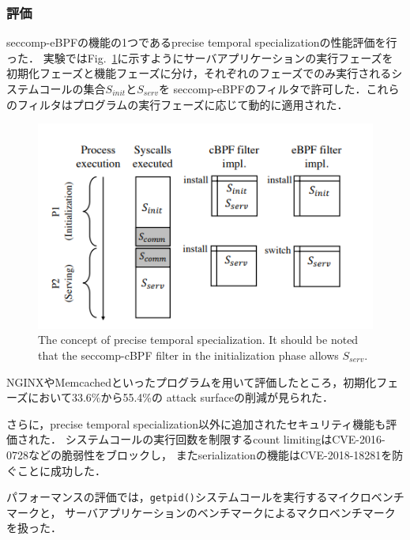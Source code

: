 \documentclass[platex,a4j,10pt,twoside,twocolumn,dvipdfmx]{jsarticle}
\newcommand{\Fref}[1]{Fig.~\ref{#1}}
\begin{document}
    \subsubsection{評価}
      seccomp-eBPFの機能の1つであるprecise temporal specializationの性能評価を行った．
      実験では\Fref{img:tmp-spec}に示すようにサーバアプリケーションの実行フェーズを
      初期化フェーズと機能フェーズに分け，それぞれのフェーズでのみ実行されるシステムコールの集合$S_{init}とS_{serv}$を
      seccomp-eBPFのフィルタで許可した．これらのフィルタはプログラムの実行フェーズに応じて動的に適用された．
      \begin{figure}[tp]
        \begin{center}
          \includegraphics[width=\columnwidth]{./img/tmp-spec.png}
        \end{center}
        \caption{The concept of precise temporal specialization. It should be noted that
        the seccomp-cBPF filter in the initialization phase allows $S_{serv}$.}
        \label{img:tmp-spec}
      \end{figure}
      NGINXやMemcachedといったプログラムを用いて評価したところ，初期化フェーズにおいて33.6\%から55.4\%の
      attack surfaceの削減が見られた．

      さらに，precise temporal specialization以外に追加されたセキュリティ機能も評価された．
      システムコールの実行回数を制限するcount limitingはCVE-2016-0728などの脆弱性をブロックし，
      またserializationの機能はCVE-2018-18281を防ぐことに成功した．
      
      パフォーマンスの評価では，\texttt{getpid()}システムコールを実行するマイクロベンチマークと，
      サーバアプリケーションのベンチマークによるマクロベンチマークを扱った．
\end{document}

